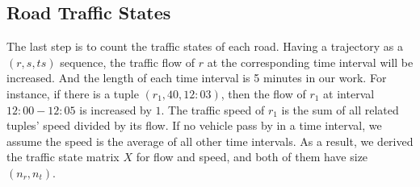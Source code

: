 \subsection{Road Traffic States}
The last step is to count the traffic states of each road. Having a trajectory as a $(r, s, ts)$ sequence, the traffic flow of $r$ at the corresponding time interval will be increased. And the length of each time interval is 5 minutes in our work. For instance, if there is a tuple $(r_1, 40, 12:03)$, then the flow of $r_1$ at interval $12:00 - 12:05$ is increased by $1$. The traffic speed of $r_1$ is the sum of all related tuples' speed divided by its flow. If no vehicle pass by in a time interval, we assume the speed is the average of all other time intervals. As a result, we derived the traffic state matrix $X$ for flow and speed, and both of them have size $(n_r, n_t)$.
